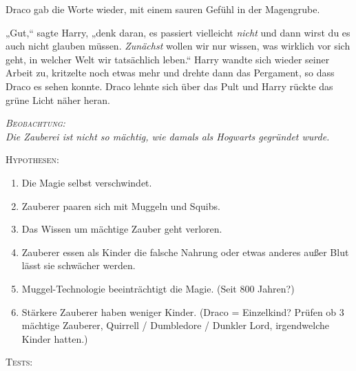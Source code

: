 Draco gab die Worte wieder, mit einem sauren Gefühl in der Magengrube.

„Gut,“ sagte Harry, „denk daran, es passiert vielleicht \emph{nicht} und dann wirst du es auch nicht glauben müssen. \emph{Zunächst} wollen wir nur wissen, was wirklich vor sich geht, in welcher Welt wir tatsächlich leben.“ Harry wandte sich wieder seiner Arbeit zu, kritzelte noch etwas mehr und drehte dann das Pergament, so dass Draco es sehen konnte. Draco lehnte sich über das Pult und Harry rückte das grüne Licht näher heran.

\begin{center}\itshape
{\scshape Beobachtung:}\\
Die Zauberei ist nicht so mächtig, wie damals als Hogwarts gegründet wurde.

{\scshape Hypothesen:}
\begin{enumerate}[1.]\firmlist
\item Die Magie selbst verschwindet.
\item Zauberer paaren sich mit Muggeln und Squibs.
\item Das Wissen um mächtige Zauber geht verloren.
\item Zauberer essen als Kinder die falsche Nahrung oder etwas anderes außer Blut lässt sie schwächer werden.
\item Muggel-Technologie beeinträchtigt die Magie. (Seit 800 Jahren?)
\item Stärkere Zauberer haben weniger Kinder. (Draco = Einzelkind? Prüfen ob 3 mächtige Zauberer, Quirrell / Dumbledore / Dunkler Lord, irgendwelche Kinder hatten.)
\end{enumerate}
{\scshape Tests:}
\end{center}

